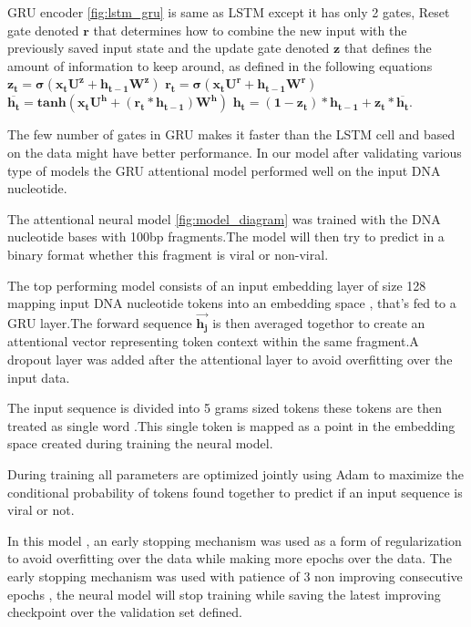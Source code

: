 \documentclass[conference]{IEEEtran}
\begin{document}
GRU encoder \ref{fig:lstm_gru} is same as LSTM except it has only 2 gates, Reset gate denoted $\mathbf{r}$ that determines how to combine the new input with the previously saved input state and the update gate denoted $\mathbf{z}$ that defines the amount of information to keep around, as defined  in the following equations \newline
$\mathbf{z_{t}=\sigma(x_{t}U^z + h_{t-1}W^z)}$ \newline
$\mathbf{r_{t}=\sigma(x_{t}U^r + h_{t-1}W^r)}$ \newline
$\mathbf{\overline{h_{t}} = tanh(x_{t}U^h + (r_{t} * h_{t-1})W^h )}$ \newline
$\mathbf{ h_{t} = (1-z_{t})*h_{t-1} +z_{t}*\overline{h_{t}}}$.

The few number of gates in GRU makes it faster than the LSTM cell and based on the data might have better performance. In our model after validating various type of models the GRU attentional model performed well on the input DNA nucleotide.

 
 The attentional neural model \ref{fig:model_diagram} was trained with the DNA nucleotide bases with 100bp fragments.The model will then try to predict in a binary format whether this fragment is viral or non-viral.
 
The top performing model consists of an input embedding layer of size 128 mapping input DNA nucleotide tokens into an embedding space , that's fed to a GRU layer.The forward sequence $\mathbf{\overrightarrow{h_{j}}}$ is then averaged togethor to create an attentional vector representing token context within the same fragment.A dropout layer was added after the attentional layer to avoid overfitting over the input data.

The input sequence is divided into 5 grams sized tokens these tokens are then treated as single word .This single token is mapped as a point in the embedding space created during training the neural model.

During training all parameters are optimized jointly using Adam to maximize the conditional probability of tokens found together to predict if an input sequence is viral or not.

 In this model , an early stopping mechanism was used as a form of regularization to avoid overfitting over the data while making more epochs over the data. The early stopping mechanism was used with patience of 3 non  improving consecutive epochs , the neural model will stop training while saving the latest improving checkpoint over the validation set defined. 
\end{document}
